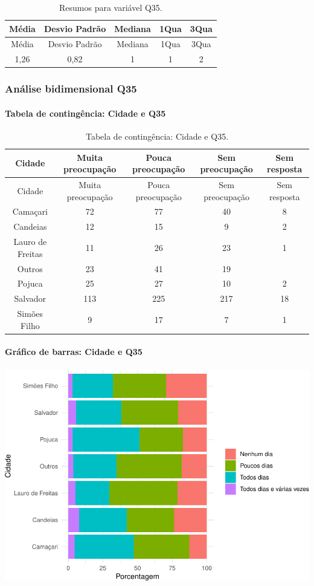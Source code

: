 \documentclass[]{article}
\let\oldparagraph\paragraph
\renewcommand{\paragraph}[1]{\oldparagraph{#1}\mbox{}}
\begin{document}
\begin{longtable}[]{@{}ccccc@{}}
\caption{\label{tab:unnamed-chunk-1250}Resumos para variável Q35.}\tabularnewline
\toprule
Média & Desvio Padrão & Mediana & 1Qua & 3Qua\tabularnewline
\midrule
\endfirsthead
\toprule
Média & Desvio Padrão & Mediana & 1Qua & 3Qua\tabularnewline
\midrule
\endhead
1,26 & 0,82 & 1 & 1 & 2\tabularnewline
\bottomrule
\end{longtable}

\cleardoublepage

\hypertarget{anuxe1lise-bidimensional-q35}{%
\subsubsection{Análise bidimensional Q35}\label{anuxe1lise-bidimensional-q35}}

\hypertarget{tabela-de-continguxeancia-cidade-e-q35}{%
\paragraph{Tabela de contingência: Cidade e Q35}\label{tabela-de-continguxeancia-cidade-e-q35}}

\begin{longtable}[]{@{}ccccc@{}}
\caption{\label{tab:unnamed-chunk-1251}Tabela de contingência: Cidade e Q35.}\tabularnewline
\toprule
Cidade & Muita preocupação & Pouca preocupação & Sem preocupação & Sem resposta\tabularnewline
\midrule
\endfirsthead
\toprule
Cidade & Muita preocupação & Pouca preocupação & Sem preocupação & Sem resposta\tabularnewline
\midrule
\endhead
Camaçari & 72 & 77 & 40 & 8\tabularnewline
Candeias & 12 & 15 & 9 & 2\tabularnewline
Lauro de Freitas & 11 & 26 & 23 & 1\tabularnewline
Outros & 23 & 41 & 19 &\tabularnewline
Pojuca & 25 & 27 & 10 & 2\tabularnewline
Salvador & 113 & 225 & 217 & 18\tabularnewline
Simões Filho & 9 & 17 & 7 & 1\tabularnewline
\bottomrule
\end{longtable}

\hypertarget{gruxe1fico-de-barras-cidade-e-q35}{%
\paragraph{Gráfico de barras: Cidade e Q35}\label{gruxe1fico-de-barras-cidade-e-q35}}

\begin{center}\includegraphics[width=0.75\linewidth]{relatorio_covid19_files/figure-latex/unnamed-chunk-1252-1} \end{center}
\end{document}
